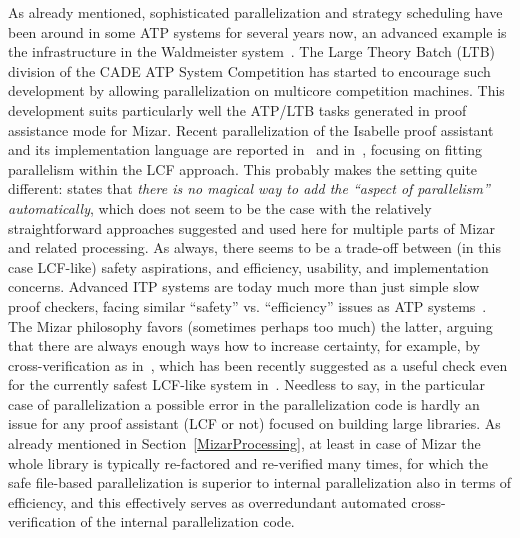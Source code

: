 \documentclass{llncs}
\makeatletter
\renewcommand\section{\@startsection{section}{1}{\z@}{-12\p@ \@plus -4\p@ \@minus -4\p@}{8\p@ \@plus 4\p@ \@minus 4\p@}{\normalfont\large\bfseries\boldmath
                        \rightskip=\z@ \@plus 8em\pretolerance=10000 }}
\makeatother
\begin{document}
\section{Related Work}
As already mentioned, sophisticated parallelization and strategy
scheduling have been around in some ATP systems for several years now,
an advanced example is the infrastructure in the Waldmeister
system~\cite{Hillenbrand03}. The Large Theory Batch (LTB) division of
the CADE ATP System Competition has started to encourage such
development by allowing parallelization on multicore competition
machines. This development suits particularly well the ATP/LTB tasks
generated in proof assistance mode for Mizar. Recent parallelization
of the Isabelle proof assistant and its implementation language are
reported in~\cite{MatthewsW10} and in~\cite{WenzelM09}, focusing on
fitting parallelism within the LCF approach. This probably makes the
setting quite different: \cite{WenzelM09} states that \textit{there is
  no magical way to add the “aspect of parallelism” automatically},
which does not seem to be the case with the relatively straightforward
approaches suggested and used here for multiple parts of Mizar and
related processing. As always, there seems to be a trade-off between
(in this case LCF-like) safety aspirations, and efficiency, usability,
and implementation concerns. Advanced ITP systems are today much more
than just simple slow proof checkers, facing similar ``safety''
vs. ``efficiency'' issues as ATP systems~\cite{ivy}.  The Mizar
philosophy favors (sometimes perhaps too much) the latter, arguing
that there are always enough ways how to increase certainty, for
example, by cross-verification as in~\cite{Urban-GDV}, which has been
recently suggested as a useful check even for the currently safest
LCF-like system in~\cite{Adams10}. Needless to say, in the particular
case of parallelization a possible error in the parallelization code
is hardly an issue for any proof assistant (LCF or not) focused on
building large libraries. As already mentioned in
Section~\ref{MizarProcessing}, at least in case of Mizar the whole
library is typically re-factored and re-verified many times, for which
the safe file-based parallelization is superior to internal
parallelization also in terms of efficiency, and this effectively
serves as overredundant automated cross-verification of the internal parallelization code.



\vspace{-1.2mm}
\end{document}
